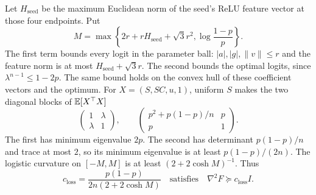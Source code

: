 Let $H_{\mathrm{seed}}$ be the maximum Euclidean norm of the seed's ReLU feature
vector at those four endpoints. Put
\[
 M=\max\left\{2r+rH_{\mathrm{seed}}+\sqrt3r^2,
                \log\frac{1-p}{p}\right\}.
\]
The first term bounds every logit in the parameter ball: $|a|,|g|,\|v\|\le r$
and the feature norm is at most $H_{\mathrm{seed}}+\sqrt3r$.
The second bounds the optimal logits, since $\lambda^{n-1}\le1-2p$.
The same bound holds on the convex hull of these coefficient vectors and the optimum.
For $X=(S,SC,u,1)$, uniform $S$ makes the two diagonal blocks of $\mathbb E[X^\top X]$
\[
 \begin{pmatrix}1&\lambda\\\lambda&1\end{pmatrix},\qquad
 \begin{pmatrix}p^2+p(1-p)/n&p\\p&1\end{pmatrix}.
\]
The first has minimum eigenvalue $2p$. The second has determinant $p(1-p)/n$
and trace at most $2$, so its minimum eigenvalue is at least $p(1-p)/(2n)$.
The logistic curvature on $[-M,M]$ is at least $(2+2\cosh M)^{-1}$. Thus
\begin{equation}
 c_{\mathrm{loss}}=\frac{p(1-p)}{2n(2+2\cosh M)}
 \quad\text{satisfies}\quad \nabla^2F\succeq c_{\mathrm{loss}}I.
 \label{eq:random-trap-loss}
\end{equation}

